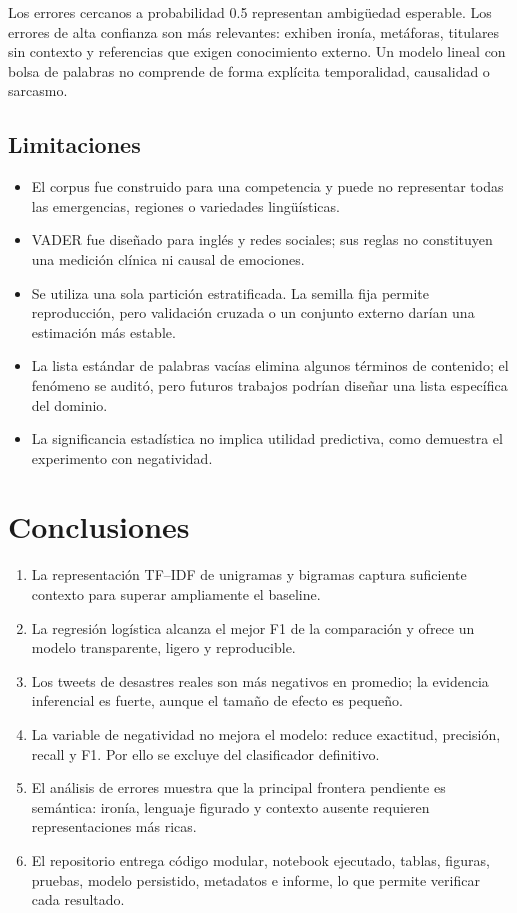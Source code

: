 \documentclass[11pt,letterpaper]{article}
\begin{document}
Los errores cercanos a probabilidad 0.5 representan ambigüedad esperable. Los errores de alta confianza son más relevantes: exhiben ironía, metáforas, titulares sin contexto y referencias que exigen conocimiento externo. Un modelo lineal con bolsa de palabras no comprende de forma explícita temporalidad, causalidad o sarcasmo.

\subsection{Limitaciones}

\begin{itemize}
  \item El corpus fue construido para una competencia y puede no representar todas las emergencias, regiones o variedades lingüísticas.
  \item VADER fue diseñado para inglés y redes sociales; sus reglas no constituyen una medición clínica ni causal de emociones.
  \item Se utiliza una sola partición estratificada. La semilla fija permite reproducción, pero validación cruzada o un conjunto externo darían una estimación más estable.
  \item La lista estándar de palabras vacías elimina algunos términos de contenido; el fenómeno se auditó, pero futuros trabajos podrían diseñar una lista específica del dominio.
  \item La significancia estadística no implica utilidad predictiva, como demuestra el experimento con negatividad.
\end{itemize}

\section{Conclusiones}

\begin{enumerate}
  \item La representación TF--IDF de unigramas y bigramas captura suficiente contexto para superar ampliamente el baseline.
  \item La regresión logística alcanza el mejor F1 de la comparación y ofrece un modelo transparente, ligero y reproducible.
  \item Los tweets de desastres reales son más negativos en promedio; la evidencia inferencial es fuerte, aunque el tamaño de efecto es pequeño.
  \item La variable de negatividad no mejora el modelo: reduce exactitud, precisión, recall y F1. Por ello se excluye del clasificador definitivo.
  \item El análisis de errores muestra que la principal frontera pendiente es semántica: ironía, lenguaje figurado y contexto ausente requieren representaciones más ricas.
  \item El repositorio entrega código modular, notebook ejecutado, tablas, figuras, pruebas, modelo persistido, metadatos e informe, lo que permite verificar cada resultado.
\end{enumerate}
\end{document}
